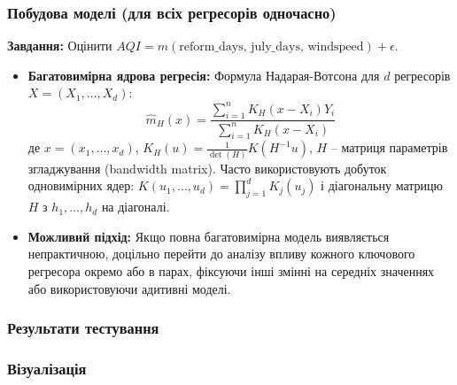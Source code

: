 ﻿\documentclass{beamer}
\begin{document}
\begin{frame}
  \frametitle{Побудова моделі (для всіх регресорів одночасно)}
  \textbf{Завдання:} Оцінити $AQI = m(\text{reform\_days, july\_days, windspeed}) + \epsilon$.

  \begin{itemize}
    \item \textbf{Багатовимірна ядрова регресія:}
    Формула Надарая-Вотсона для $d$ регресорів $X = (X_1, \dots, X_d)$:
    $$ \hat{m}_H(x) = \frac{\sum_{i=1}^{n} K_H(x - X_i) Y_i}{\sum_{i=1}^{n} K_H(x - X_i)} $$
    де $x = (x_1, \dots, x_d)$, $K_H(u) = \frac{1}{\det(H)} K(H^{-1}u)$, $H$ – матриця параметрів згладжування (bandwidth matrix).
    Часто використовують добуток одновимірних ядер: $K(u_1, \dots, u_d) = \prod_{j=1}^d K_j(u_j)$ і діагональну матрицю $H$ з $h_1, \dots, h_d$ на діагоналі.


    \item \textbf{Можливий підхід:} Якщо повна багатовимірна модель виявляється непрактичною, доцільно перейти до аналізу впливу кожного ключового регресора окремо або в парах, фіксуючи інші змінні на середніх значеннях або використовуючи адитивні моделі.
  \end{itemize}
\end{frame}


\begin{frame}
  \frametitle{Результати тестування}
\end{frame}

\begin{frame}
  \frametitle{Візуалізація}
\end{frame}
\end{document}
